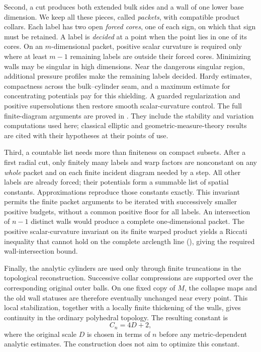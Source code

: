 Second, a cut produces both extended bulk sides and a wall of one lower
base dimension. We keep all these pieces, called \emph{packets}, with
compatible product collars. Each label has two open \emph{forced cores},
one of each sign, on which that sign must be retained. A label is
\emph{decided} at a point when the point lies in one of its cores.
On an \(m\)-dimensional packet, positive
scalar curvature is required only where at least \(m-1\) remaining
labels are outside their forced cores. Minimizing walls may be
singular in high dimensions. Near the dangerous singular region,
additional pressure profiles make the remaining labels decided.
Hardy estimates, compactness across the bulk--cylinder seam, and a
maximum estimate for concentrating potentials pay for this shielding.
A guarded regularization and positive supersolutions then restore
smooth scalar-curvature control. The full finite-diagram arguments are
proved in .
They include the stability and variation computations used here;
classical elliptic and geometric-measure-theory results are cited with
their hypotheses at their points of use.

Third, a countable list needs more than finiteness on compact subsets.
After a first radial cut, only finitely many labels and warp factors
are nonconstant on any \emph{whole} packet and on each finite incident
diagram needed by a step. All other labels are already forced; their
potentials form a summable list of spatial constants. Approximations
reproduce those constants exactly. This invariant permits the finite
packet arguments to be iterated with successively smaller positive
budgets, without a common positive floor for all labels. An intersection
of \(n-1\) distinct walls would produce a complete one-dimensional
packet. The positive scalar-curvature invariant on its finite warped
product yields a Riccati inequality that cannot hold on the complete
arclength line (), giving the required
wall-intersection bound.

Finally, the analytic cylinders are used only through finite
truncations in the topological reconstruction. Successive collar
compressions are supported over the corresponding original outer
balls. On one fixed copy of \(M\), the collapse maps and the old wall
statuses are therefore eventually unchanged near every point. This
local stabilization, together with a locally finite thickening of the
walls, gives continuity in the ordinary polyhedral topology. The
resulting constant is
\[
 C_n=4D+2,
\]
where the original scale \(D\) is chosen in terms of \(n\) before any
metric-dependent analytic estimates. The construction does not aim to optimize this constant.

